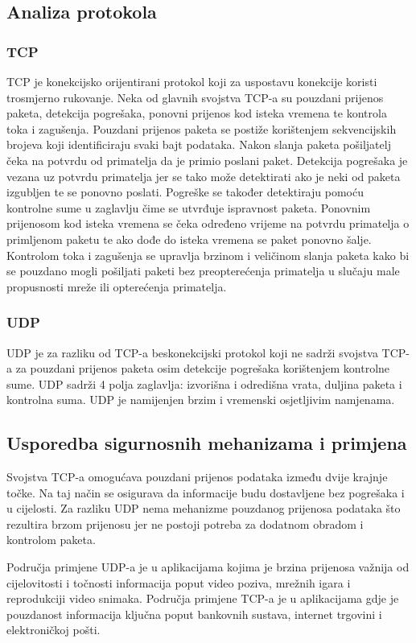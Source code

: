 \documentclass[times, utf8, diplomski]{fer}
\begin{document}
\subsection{Analiza protokola}
\subsubsection{TCP}
TCP je konekcijsko orijentirani protokol koji za uspostavu konekcije koristi trosmjerno rukovanje. Neka od glavnih svojstva TCP-a su pouzdani prijenos paketa, detekcija pogrešaka, ponovni prijenos kod isteka vremena te kontrola toka i zagušenja. Pouzdani prijenos paketa se postiže korištenjem sekvencijskih brojeva koji identificiraju svaki bajt podataka. Nakon slanja paketa pošiljatelj čeka na potvrdu od primatelja da je primio poslani paket. Detekcija pogrešaka je vezana uz potvrdu primatelja jer se tako može detektirati ako je neki od paketa izgubljen te se ponovno poslati. Pogreške se također detektiraju pomoću kontrolne sume u zaglavlju čime se utvrđuje ispravnost paketa. Ponovnim prijenosom kod isteka vremena se čeka određeno vrijeme na potvrdu primatelja o primljenom paketu te ako dođe do isteka vremena se paket ponovno šalje. Kontrolom toka i zagušenja se upravlja brzinom i veličinom slanja paketa kako bi se pouzdano mogli pošiljati paketi bez preopterećenja primatelja u slučaju male propusnosti mreže ili opterećenja primatelja.

\subsubsection{UDP}
UDP je za razliku od TCP-a beskonekcijski protokol koji ne sadrži svojstva TCP-a za pouzdani prijenos paketa osim detekcije pogrešaka korištenjem kontrolne sume. UDP sadrži 4 polja zaglavlja: izvorišna i odredišna vrata, duljina paketa i kontrolna suma. UDP je namijenjen brzim i vremenski osjetljivim namjenama.

\subsection{Usporedba sigurnosnih mehanizama i primjena}
Svojstva TCP-a omogućava pouzdani prijenos podataka između dvije krajnje točke. Na taj način se osigurava da informacije budu dostavljene bez pogrešaka i u cijelosti. Za razliku UDP nema mehanizme pouzdanog prijenosa podataka što rezultira brzom prijenosu jer ne postoji potreba za dodatnom obradom i kontrolom paketa. 

Područja primjene UDP-a je u aplikacijama kojima je brzina prijenosa važnija od cijelovitosti i točnosti informacija poput video poziva, mrežnih igara i reprodukciji video snimaka. Područja primjene TCP-a je u aplikacijama gdje je pouzdanost informacija ključna poput bankovnih sustava, internet trgovini i elektroničkoj pošti.
\end{document}
